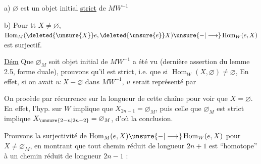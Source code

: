 
a) $\varnothing$ est un objet initial \uline{strict} de $MW^{-1}$

b) Pour tt $X\ne\varnothing$, $\operatorname{Hom}_M(\deleted{\unsure{X}}e,\deleted{\unsure{e}}X)\unsure{{-}|\longrightarrow}\operatorname{Hom}_W(e,X)$ est surjectif.

\uline{Dém} Que $\varnothing_M$ soit objet initial de $MW^{-1}$ a été vu (dernière assertion du lemme 2.5, forme duale), prouvons qu'il est strict, i.e. que si  $\operatorname{Hom}_W(X,\varnothing)\ne\varnothing$,  En effet,  si on avait $u:X{-}\varnothing$ dans $MW^{-1}$, $u$ serait représenté par


On procède par récurrence sur la longueur de cette chaîne pour voir que $X=\varnothing$. En effet, l'hyp. sur $W$ implique que $X_{2n-1}=\varnothing_M$, puis celle que $\varnothing_M$ est strict implique $X_{\unsure{2-n|2n-2}}=\varnothing_M$, d'où la conclusion.



 Prouvons la surjectivité de $\operatorname{Hom}_M(e,X)\unsure{{-}|\longrightarrow}\operatorname{Hom}_W(e,X)$ pour $X\ne\varnothing_M$, en montrant que tout chemin réduit de longueur $2n+1$ est ``homotope'' à un chemin réduit de longueur $2n-1$ :


